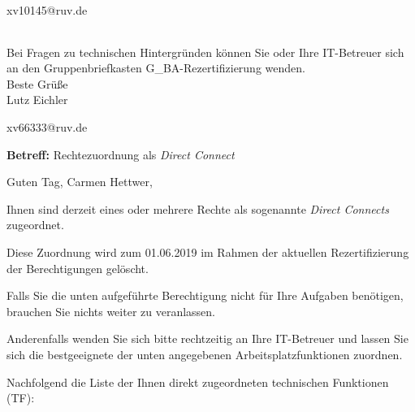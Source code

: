 \documentclass[a4paper,landscape,12pt]{letter}
\begin{document}
\begin{letter}{xv10145@ruv.de\hfill \break}
\begin{tiny}
\begin{longtable}{|p{35mm}|p{15mm}|p{25mm}|p{10mm}|p{40mm}|p{50mm}|p{50mm}|}
\hline
		\end{longtable}
		\end{tiny}
	
\begin{minipage}{\textwidth}
			Bei Fragen zu technischen Hintergründen können Sie 
			oder Ihre IT-Betreuer sich an den Gruppenbriefkasten 
			G\_BA-Rezertifizierung
			wenden.\\
			\linebreak
			Beste Grüße\\
			Lutz Eichler
	\end{minipage}
	\end{letter}
	
\begin{letter}{xv66333@ruv.de\hfill \break}
\begin{normalsize}
	\opening{\textbf{Betreff:} Rechtezuordnung als \emph{Direct Connect}}
	\begin{normalsize} \hfill
	\end{normalsize}

	\begin{normalsize}
		Guten Tag, 
	Carmen Hettwer, \hfill \break
	\end{normalsize}
	\end{normalsize}
	
\begin{normalsize}
	Ihnen sind derzeit eines oder mehrere Rechte als sogenannte \emph{Direct Connects} zugeordnet.
	
	Diese Zuordnung wird zum 01.06.2019 im Rahmen der aktuellen Rezertifizierung der Berechtigungen gelöscht.
	
	Falls Sie die unten aufgeführte Berechtigung nicht für Ihre Aufgaben benötigen, 
	brauchen Sie nichts weiter zu veranlassen.
	
	Anderenfalls wenden Sie sich bitte rechtzeitig an Ihre IT-Betreuer 
	und lassen Sie sich die bestgeeignete der unten angegebenen Arbeitsplatzfunktionen zuordnen.
	\end{normalsize}
	
\begin{normalsize}
	Nachfolgend die Liste der Ihnen direkt zugeordneten technischen Funktionen (TF):


\end{normalsize}
\end{letter}
\end{document}
